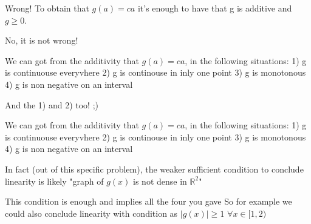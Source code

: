 \begin{solution}
	\begin{tcolorbox}
Wrong! To obtain that $g(a)=ca$ it’s enough to have that g is additive and $g\geq0$.\end{tcolorbox}

\begin{bolded}No, it is not wrong!\end{bolded}
We can got from the additivity that $g(a)=ca$, in the following situations:
1) g is continuouse everyvhere
2) g is continouse in inly one point
3) g is monotonous 
4) g is non negative on an interval


\end{solution}






\begin{solution}
	And the 1) and 2) too! ;) 
\end{solution}



\begin{solution}
	\begin{tcolorbox}We can got from the additivity that $g(a)=ca$, in the following situations:
1) g is continuouse everyvhere
2) g is continouse in inly one point
3) g is monotonous 
4) g is non negative on an interval\end{tcolorbox}
In fact (out of this specific problem), the weaker sufficient condition to conclude linearity is likely "graph of $g(x)$ is not dense in $\mathbb R^2$"

This condition is enough and implies all the four you gave
So for example we could also conclude linearity with condition as $|g(x)|\ge 1$ $\forall x\in[1,2)$



\end{solution}



